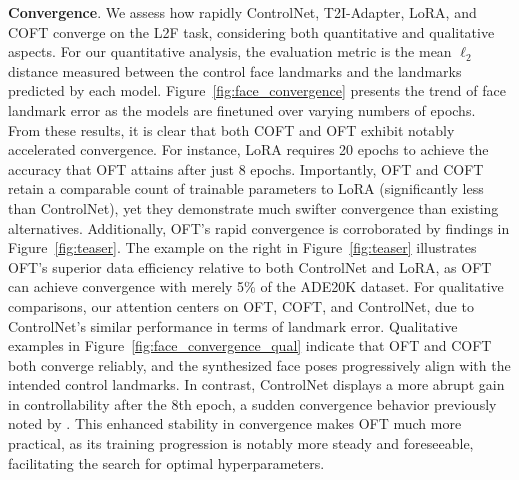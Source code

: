 \textbf{Convergence}. We assess how rapidly ControlNet, T2I-Adapter, LoRA, and COFT converge on the L2F task, considering both quantitative and qualitative aspects. For our quantitative analysis, the evaluation metric is the mean $\ell_2$ distance measured between the control face landmarks and the landmarks predicted by each model. Figure~\ref{fig:face_convergence} presents the trend of face landmark error as the models are finetuned over varying numbers of epochs. From these results, it is clear that both COFT and OFT exhibit notably accelerated convergence. For instance, LoRA requires 20 epochs to achieve the accuracy that OFT attains after just 8 epochs. Importantly, OFT and COFT retain a comparable count of trainable parameters to LoRA (significantly less than ControlNet), yet they demonstrate much swifter convergence than existing alternatives. Additionally, OFT’s rapid convergence is corroborated by findings in Figure~\ref{fig:teaser}. The example on the right in Figure~\ref{fig:teaser} illustrates OFT’s superior data efficiency relative to both ControlNet and LoRA, as OFT can achieve convergence with merely 5\% of the ADE20K dataset. For qualitative comparisons, our attention centers on OFT, COFT, and ControlNet, due to ControlNet's similar performance in terms of landmark error. Qualitative examples in Figure~\ref{fig:face_convergence_qual} indicate that OFT and COFT both converge reliably, and the synthesized face poses progressively align with the intended control landmarks. In contrast, ControlNet displays a more abrupt gain in controllability after the 8th epoch, a sudden convergence behavior previously noted by \cite{zhang2023adding}. This enhanced stability in convergence makes OFT much more practical, as its training progression is notably more steady and foreseeable, facilitating the search for optimal hyperparameters.


